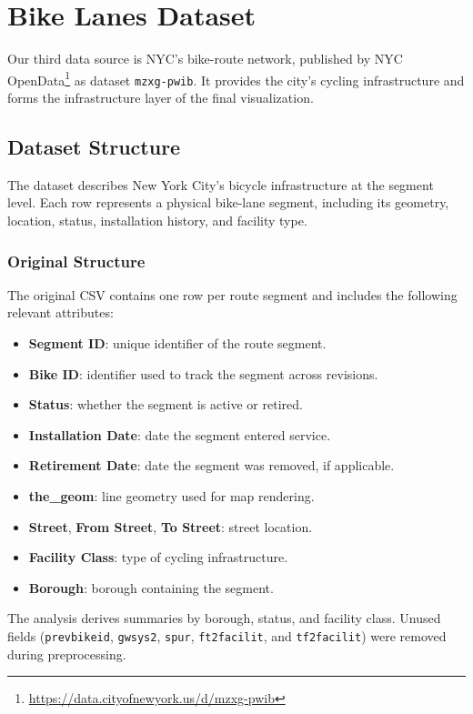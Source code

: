 \section{Bike Lanes Dataset}
Our third data source is NYC's bike-route network, published by NYC OpenData\footnote{\url{https://data.cityofnewyork.us/d/mzxg-pwib}} as dataset \texttt{mzxg-pwib}. It provides the city's cycling infrastructure and forms the infrastructure layer of the final visualization.

\subsection{Dataset Structure}

The dataset describes New York City's bicycle infrastructure at the segment level. Each row represents a physical bike-lane segment, including its geometry, location, status, installation history, and facility type.

\subsubsection{Original Structure}

The original CSV contains one row per route segment and includes the following relevant attributes:
\begin{itemize}
  \item \textbf{Segment ID}: unique identifier of the route segment.
  \item \textbf{Bike ID}: identifier used to track the segment across revisions.
  \item \textbf{Status}: whether the segment is active or retired.
  \item \textbf{Installation Date}: date the segment entered service.
  \item \textbf{Retirement Date}: date the segment was removed, if applicable.
  \item \textbf{the\_geom}: line geometry used for map rendering.
  \item \textbf{Street}, \textbf{From Street}, \textbf{To Street}: street location.
  \item \textbf{Facility Class}: type of cycling infrastructure.
  \item \textbf{Borough}: borough containing the segment.
\end{itemize}

The analysis derives summaries by borough, status, and facility class. Unused fields (\texttt{prevbikeid}, \texttt{gwsys2}, \texttt{spur}, \texttt{ft2facilit}, and \texttt{tf2facilit}) were removed during preprocessing.

